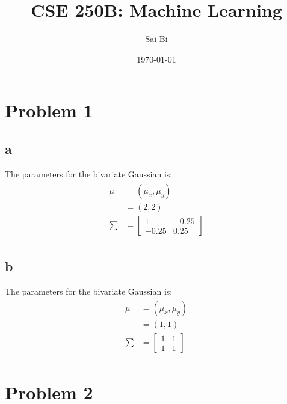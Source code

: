 \documentclass[a4paper,11pt]{article}
\theoremstyle{mytheor}
\begin{document}
\title{CSE 250B: Machine Learning}

\author{Sai Bi}

\date{\today}

\maketitle

\section*{Problem 1}
\subsection*{a}
The parameters for the bivariate Gaussian is:
\begin{align}
	\begin{split}
	\mu &= (\mu_x, \mu_y) \\
	    &= (2, 2)  \\
	\sum &= \begin{bmatrix}
				1  & -0.25 \\
				-0.25 & 0.25 
			\end{bmatrix}
	\end{split}
\end{align}

\subsection*{b}
The parameters for the bivariate Gaussian is:
\begin{align}
\begin{split}
\mu &= (\mu_x, \mu_y) \\
&= (1, 1)  \\
\sum &= \begin{bmatrix}
1  & 1 \\
1 & 1 
\end{bmatrix}
\end{split}
\end{align}

\section*{Problem 2}
\end{document}
